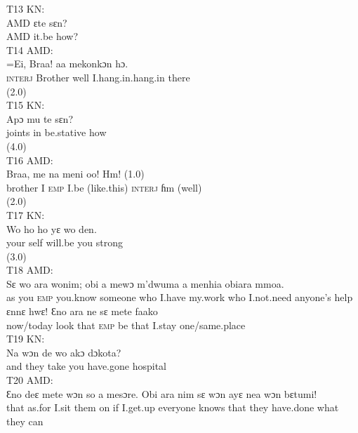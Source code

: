 \documentclass[output=paper,colorlinks,citecolor=brown]{langscibook}
\begin{document}
   \noindent{}
\ea\label{ex:obeng:13}
    T13 KN:\\
    \gll    AMD ɛte sɛn?\\
            AMD it.be how?\\
\ex\label{ex:obeng:14}
    T14 AMD:\\
    \gll    =Ei, Braa! aa mekonkɔn hɔ.\\
            \textsc{interj} Brother well I.hang.in.hang.in there \\
            (2.0)\\
\ex\label{ex:obeng:15}
    T15 KN:\\
    \gll    Apɔ mu te sɛn? \\
            joints in be.stative how\\
            (4.0)\\
\ex\label{ex:obeng:16}
    T16 AMD:\\
    \gll    Braa, me na meni oo! Hm! (1.0)\\
            brother I \textsc{emp} I.be (like.this) \textsc{interj} ɦm (well)\\
            (2.0)\\
\ex\label{ex:obeng:17}
    T17 KN:\\
    \gll    Wo ho ho yɛ wo den.\\
            your self will.be you strong\\
            (3.0)\\
\ex\label{ex:obeng:18}
    T18 AMD:\\
    \ea
    \gll    Sɛ wo ara wonim; obi a mewɔ m’dwuma a menhia obiara mmoa.\\
            as you \textsc{emp} you.know someone who I.have my.work who I.not.need anyone’s help\\
    \ex
    \gll    ɛnnɛ hwɛ! Ɛno ara ne sɛ mete faako \\
            now/today look that \textsc{emp} be that I.stay one/same.place\\
    \z
\ex\label{ex:obeng:19}
    T19 KN:\\
    \gll    Na wɔn de wo akɔ dɔkota?\\
            and they take you have.gone hospital\\
\ex\label{ex:obeng:20}
    T20 AMD:\\
    \gll    Ɛno deɛ mete wɔn so a mesɔre. Obi ara nim sɛ wɔn ayɛ nea wɔn bɛtumi!\\
            that as.for I.sit them on if I.get.up everyone knows that they have.done what they can\\
\end{document}
